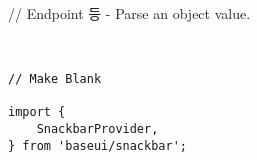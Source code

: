 \documentclass{article}
\begin{document}
// Endpoint 등 - Parse an object value.
\begin{lstlisting}


// Make Blank

import {
	SnackbarProvider,
} from 'baseui/snackbar';


\end{lstlisting}
\end{document}

